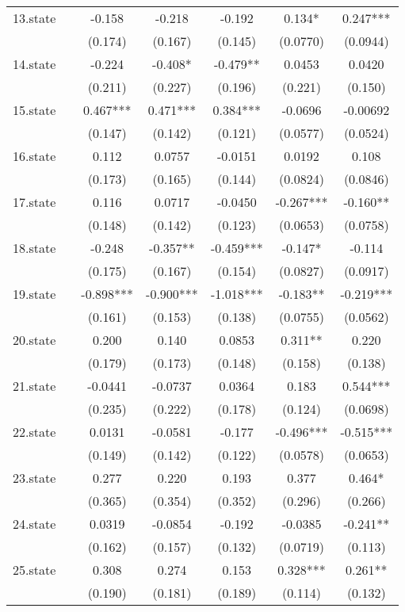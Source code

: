 \documentclass[]{article}
\begin{document}
\begin{tabular}{lcccccc}
13.state &  & -0.158 & -0.218 & -0.192 & 0.134* & 0.247*** \\
 &  & (0.174) & (0.167) & (0.145) & (0.0770) & (0.0944) \\
14.state &  & -0.224 & -0.408* & -0.479** & 0.0453 & 0.0420 \\
 &  & (0.211) & (0.227) & (0.196) & (0.221) & (0.150) \\
15.state &  & 0.467*** & 0.471*** & 0.384*** & -0.0696 & -0.00692 \\
 &  & (0.147) & (0.142) & (0.121) & (0.0577) & (0.0524) \\
16.state &  & 0.112 & 0.0757 & -0.0151 & 0.0192 & 0.108 \\
 &  & (0.173) & (0.165) & (0.144) & (0.0824) & (0.0846) \\
17.state &  & 0.116 & 0.0717 & -0.0450 & -0.267*** & -0.160** \\
 &  & (0.148) & (0.142) & (0.123) & (0.0653) & (0.0758) \\
18.state &  & -0.248 & -0.357** & -0.459*** & -0.147* & -0.114 \\
 &  & (0.175) & (0.167) & (0.154) & (0.0827) & (0.0917) \\
19.state &  & -0.898*** & -0.900*** & -1.018*** & -0.183** & -0.219*** \\
 &  & (0.161) & (0.153) & (0.138) & (0.0755) & (0.0562) \\
20.state &  & 0.200 & 0.140 & 0.0853 & 0.311** & 0.220 \\
 &  & (0.179) & (0.173) & (0.148) & (0.158) & (0.138) \\
21.state &  & -0.0441 & -0.0737 & 0.0364 & 0.183 & 0.544*** \\
 &  & (0.235) & (0.222) & (0.178) & (0.124) & (0.0698) \\
22.state &  & 0.0131 & -0.0581 & -0.177 & -0.496*** & -0.515*** \\
 &  & (0.149) & (0.142) & (0.122) & (0.0578) & (0.0653) \\
23.state &  & 0.277 & 0.220 & 0.193 & 0.377 & 0.464* \\
 &  & (0.365) & (0.354) & (0.352) & (0.296) & (0.266) \\
24.state &  & 0.0319 & -0.0854 & -0.192 & -0.0385 & -0.241** \\
 &  & (0.162) & (0.157) & (0.132) & (0.0719) & (0.113) \\
25.state &  & 0.308 & 0.274 & 0.153 & 0.328*** & 0.261** \\
 &  & (0.190) & (0.181) & (0.189) & (0.114) & (0.132) \\

\end{tabular}
\end{document}
